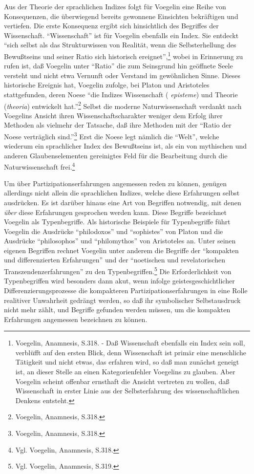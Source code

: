Aus der Theorie der sprachlichen Indizes folgt für Voegelin eine Reihe
von Konsequenzen, die überwiegend bereits gewonnene Einsichten bekräftigen und
vertiefen. Die erste Konsequenz ergibt sich hinsichtlich des
Begriffes der Wissenschaft. "`Wissenschaft"' ist für Voegelin ebenfalls ein
Index. Sie entdeckt "`sich selbst als das Strukturwissen von Realität, wenn
die Selbsterhellung des Bewußtseins und seiner Ratio sich historisch
ereignet"',\footnote{Voegelin, Anamnesis, S.318. - Daß Wissenschaft ebenfalls
  ein Index sein soll, verblüfft auf den ersten Blick, denn Wissenschaft ist
  primär eine menschliche Tätigkeit und nicht etwas, das erfahren wird, so daß
  man zunächst geneigt ist, an dieser Stelle an einen Kategorienfehler
  Voegelins zu glauben. Aber Voegelin scheint offenbar ernsthaft die Ansicht
  vertreten zu wollen, daß Wissenschaft in erster Linie aus der
  Selbsterfahrung des wissenschaftlichen Denkens entsteht.} wobei in
Erinnerung zu rufen ist, daß Voegelin unter "`Ratio"' die zum Seinsgrund hin
geöffnete Seele versteht und nicht etwa Vernunft oder Verstand im gewöhnlichen
Sinne. Dieses historische Ereignis hat, Voegelin zufolge, bei Platon und
Aristoteles stattgefunden, deren Noese "`die Indizes Wissenschaft ({\it
  episteme}) und Theorie ({\it theoria}) entwickelt hat."'\footnote{Voegelin,
  Anamnesis, S.318.} Selbst die moderne Naturwissenschaft verdankt nach
Voegelins Ansicht ihren Wissenschaftscharakter weniger dem Erfolg ihrer
Methoden als vielmehr der Tatsache, daß ihre Methoden mit der "`Ratio der
Noese verträglich sind."'\footnote{Voegelin, Anamnesis, S.318.} Erst die Noese
legt nämlich die "`Welt"', welche wiederum ein sprachlicher Index des
Bewußtseins ist, als ein von mythischen und anderen Glaubenselementen
gereinigtes Feld für die Bearbeitung durch die Naturwissenschaft
frei.\footnote{Vgl. Voegelin, Anamnesis, S.318.}

Um über Partizipationserfahrungen angemessen reden zu können, genügen
allerdings nicht allein die sprachlichen Indizes, welche diese Erfahrungen
selbst ausdrücken. Es ist darüber hinaus eine Art von Begriffen notwendig, mit
denen {\it über} diese Erfahrungen gesprochen werden kann. Diese Begriffe
bezeichnet Voegelin als Typenbegriffe. Als historische Beispiele für
Typenbegriffe führt Voegelin die Ausdrücke "`philodoxos"' und "`sophistes"'
von Platon und die Ausdrücke "`philosophos"' und "`philomythos"' von
Aristoteles an. Unter seinen eigenen Begriffen rechnet Voegelin unter anderem
die Begriffe der "`kompakten und differenzierten Erfahrungen"' und der
"`noetischen und revelatorischen Transzendenzerfahrungen"' zu den
Typenbegriffen.\footnote{Vgl. Voegelin, Anamnesis, S.319.} Die
Erforderlichkeit von Typenbegriffen wird besonders dann akut, wenn infolge
geistesgeschichtlicher Differenzierungsprozesse die kompakteren
Partizipationserfahrungen in eine Rolle realitiver Unwahrheit gedrängt werden,
so daß ihr symbolischer Selbstausdruck nicht mehr zählt, und Begriffe gefunden
werden müssen, um die kompakten Erfahrungen angemessen bezeichnen zu können.

